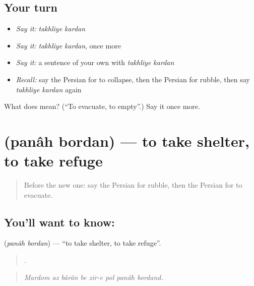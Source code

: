 \subsection*{Your turn}
\begin{itemize}
\raggedright
  \item \emph{Say it:} \emph{takhliye kardan}
  \item \emph{Say it:} \emph{takhliye kardan}, once more
  \item \emph{Say it:} a sentence of your own with \emph{takhliye kardan}
  \item \emph{Recall:} say the Persian for to collapse, then the Persian for rubble, then say \emph{takhliye kardan} again
\end{itemize}

\begin{tcolorbox}[breakable,colback=teal!4,colframe=teal!35!black,title={Before you move on}]
What does   mean? (\textquotedblleft{}To evacuate, to empty\textquotedblright{}.) Say it once more.
\end{tcolorbox}
\section[\texorpdfstring{\fa{پناه} \fa{بردن} (panâh bordan)}{پناه بردن (panâh bordan)}]{  (panâh bordan) — to take shelter, to take refuge}

\label{lesson:FA-C331-panah-bordan}



\begin{quote}
Before the new one: say the Persian for rubble, then the Persian for to evacuate.
\end{quote}

\subsection*{You'll want to know:  }
\textbf{ } (\emph{panâh bordan}) — \textquotedblleft{}to take shelter, to take refuge\textquotedblright{}.

\begin{quote}
       .
\end{quote}

\begin{quote}
\emph{Mardom az bârân be zir-e pol panâh bordand.}
\end{quote}

